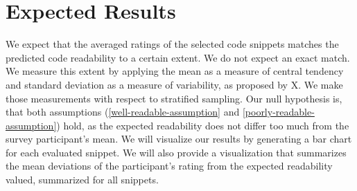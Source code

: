 \documentclass[%
class=scrreprt,
chapterprefix=false,%
open=right,%
twoside=false,%
paper=a4,%
logofile={Logo\_zentral\_farbig\_EN.png},%
thesistype=masterproposal,%
UKenglish,%
]{se2thesis}
\begin{document}
\section{Expected Results}
We expect that the averaged ratings of the selected code snippets matches the predicted code readability to a certain extent. We do not expect an exact match.
We measure this extent by applying the mean as a measure of central tendency and standard deviation as a measure of variability, as proposed by X. We make those measurements with respect to stratified sampling.
Our null hypothesis is, that both assumptions (\ref{well-readable-assumption} and \ref{poorly-readable-assumption}) hold, as the expected readability does not differ too much from the survey participant's mean.
We will visualize our results by generating a bar chart for each evaluated snippet. We will also provide a visualization that summarizes the mean deviations of the participant's rating from the expected readability valued, summarized for all snippets.

	
	\backmatter
	
	\printbibliography
	
\end{document}
